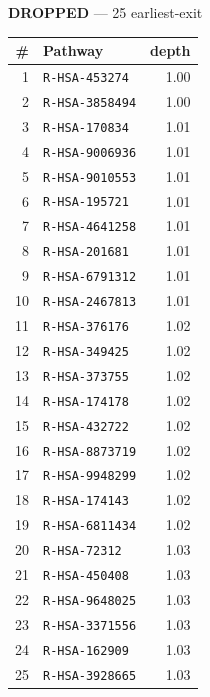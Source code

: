 \documentclass[10pt]{article}
\begin{document}
\begin{minipage}[t]{0.48\textwidth}\centering\textbf{\color{red!60!black}DROPPED} --- 25 earliest-exit\\[3pt]
\begin{tabular}{@{}r l r@{}}
\toprule
\# & Pathway & depth \\
\midrule
1 & \texttt{R-HSA-453274} & 1.00 \\
2 & \texttt{R-HSA-3858494} & 1.00 \\
3 & \texttt{R-HSA-170834} & 1.01 \\
4 & \texttt{R-HSA-9006936} & 1.01 \\
5 & \texttt{R-HSA-9010553} & 1.01 \\
6 & \texttt{R-HSA-195721} & 1.01 \\
7 & \texttt{R-HSA-4641258} & 1.01 \\
8 & \texttt{R-HSA-201681} & 1.01 \\
9 & \texttt{R-HSA-6791312} & 1.01 \\
10 & \texttt{R-HSA-2467813} & 1.01 \\
11 & \texttt{R-HSA-376176} & 1.02 \\
12 & \texttt{R-HSA-349425} & 1.02 \\
13 & \texttt{R-HSA-373755} & 1.02 \\
14 & \texttt{R-HSA-174178} & 1.02 \\
15 & \texttt{R-HSA-432722} & 1.02 \\
16 & \texttt{R-HSA-8873719} & 1.02 \\
17 & \texttt{R-HSA-9948299} & 1.02 \\
18 & \texttt{R-HSA-174143} & 1.02 \\
19 & \texttt{R-HSA-6811434} & 1.02 \\
20 & \texttt{R-HSA-72312} & 1.03 \\
21 & \texttt{R-HSA-450408} & 1.03 \\
22 & \texttt{R-HSA-9648025} & 1.03 \\
23 & \texttt{R-HSA-3371556} & 1.03 \\
24 & \texttt{R-HSA-162909} & 1.03 \\
25 & \texttt{R-HSA-3928665} & 1.03 \\
\bottomrule
\end{tabular}
\end{minipage}
\end{document}
